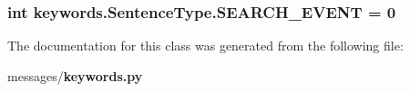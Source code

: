\subsubsection[{S\+E\+A\+R\+C\+H\+\_\+\+E\+V\+E\+NT}]{\setlength{\rightskip}{0pt plus 5cm}int keywords.\+Sentence\+Type.\+S\+E\+A\+R\+C\+H\+\_\+\+E\+V\+E\+NT = 0\hspace{0.3cm}{\ttfamily [static]}}\label{classkeywords_1_1_sentence_type_aa86de6e008f0d5c9717e590e3028a79e}


The documentation for this class was generated from the following file\+:\begin{DoxyCompactItemize}
\item 
messages/{\bf keywords.\+py}\end{DoxyCompactItemize}
